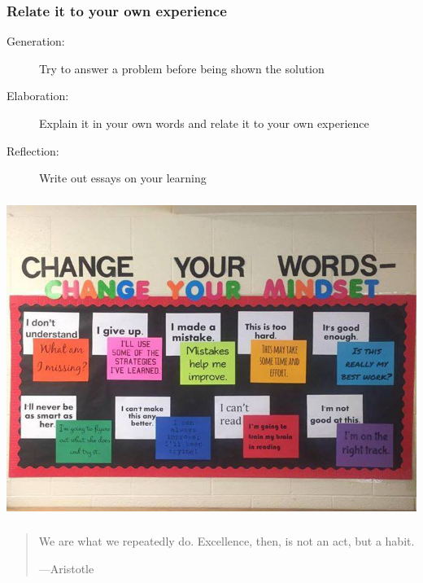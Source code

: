 \documentclass{beamer}
\newcommand{\bfr}[1]{\begin{frame}[fragile]\frametitle{{ #1 }}}
\begin{document}
\bfr{Relate it to your own experience}

\begin{description}
\item[Generation:]
  Try to answer a problem before being shown the solution
\item[Elaboration:]
  Explain it in your own words and relate it to your own experience
\item[Reflection:] Write out essays on your learning
\end{description}
\end{frame}


\bfr{}
\includegraphics[width=\textwidth]{changeyourvocabulary.jpg}
\end{frame}

\bfr{}

\LARGE 
\begin{quotation}
We are what we repeatedly do. Excellence, then, is not an act, but a habit.

\hfill ---Aristotle
\end{quotation}

\end{frame}
\end{document}
